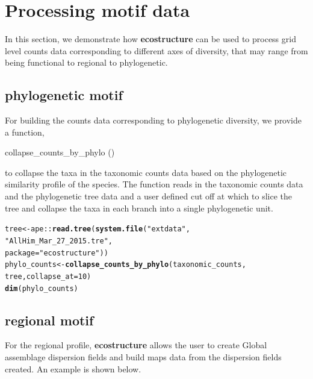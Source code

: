 \documentclass[12pt]{article}\usepackage[]{graphicx}\usepackage[usenames,dvipsnames]{color}
\makeatletter
\newcommand{\hlnum}[1]{\textcolor[rgb]{0.686,0.059,0.569}{#1}}%
\newcommand{\hlstr}[1]{\textcolor[rgb]{0.192,0.494,0.8}{#1}}%
\newcommand{\hlopt}[1]{\textcolor[rgb]{0,0,0}{#1}}%
\newcommand{\hlstd}[1]{\textcolor[rgb]{0.345,0.345,0.345}{#1}}%
\newcommand{\hlkwb}[1]{\textcolor[rgb]{0.69,0.353,0.396}{#1}}%
\newcommand{\hlkwc}[1]{\textcolor[rgb]{0.333,0.667,0.333}{#1}}%
\newcommand{\hlkwd}[1]{\textcolor[rgb]{0.737,0.353,0.396}{\textbf{#1}}}%
\newenvironment{kframe}{%
 \def\at@end@of@kframe{}%
 \ifinner\ifhmode%
  \def\at@end@of@kframe{\end{minipage}}%
  \begin{minipage}{\columnwidth}%
 \fi\fi%
 \def\FrameCommand##1{\hskip\@totalleftmargin \hskip-\fboxsep
 \colorbox{shadecolor}{##1}\hskip-\fboxsep
     \hskip-\linewidth \hskip-\@totalleftmargin \hskip\columnwidth}%
 \MakeFramed {\advance\hsize-\width
   \@totalleftmargin\z@ \linewidth\hsize
   \@setminipage}}%
 {\par\unskip\endMakeFramed%
 \at@end@of@kframe}
\newenvironment{knitrout}{}{} %
\makeatother
\begin{document}
\section{Processing motif data}

In this section, we demonstrate how \textbf{ecostructure} can be used to process
grid level counts data corresponding to different axes of diversity, that may range from being functional to regional to phylogenetic.

\subsection{phylogenetic motif}

For building the counts data corresponding to phylogenetic diversity, we provide a function,
\begin{verb} collapse_counts_by_phylo () \end{verb} to collapse the taxa in the taxonomic counts data based on the phylogenetic similarity profile of the species.
The function reads in the taxonomic counts data and the phylogenetic tree data and a user defined cut off at which to slice the tree and collapse the taxa in each branch into a single phylogenetic unit.

\begin{knitrout}
\color{fgcolor}\begin{kframe}
\begin{alltt}
\hlstd{tree} \hlkwb{<-} \hlstd{ape}\hlopt{::}\hlkwd{read.tree}\hlstd{(}\hlkwd{system.file}\hlstd{(}\hlstr{"extdata"}\hlstd{,}
                                   \hlstr{"AllHim_Mar_27_2015.tre"}\hlstd{,}
                                    \hlkwc{package} \hlstd{=} \hlstr{"ecostructure"}\hlstd{))}
\hlstd{phylo_counts} \hlkwb{<-} \hlkwd{collapse_counts_by_phylo}\hlstd{(taxonomic_counts,}
                                         \hlstd{tree,} \hlkwc{collapse_at} \hlstd{=} \hlnum{10}\hlstd{)}
\hlkwd{dim}\hlstd{(phylo_counts)}
\end{alltt}
\end{kframe}
\end{knitrout}

\subsection{regional motif}

For the regional profile, \textbf{ecostructure} allows the user to create Global assemblage dispersion fields and build maps data from the dispersion fields created. An example is shown below.
\end{document}
